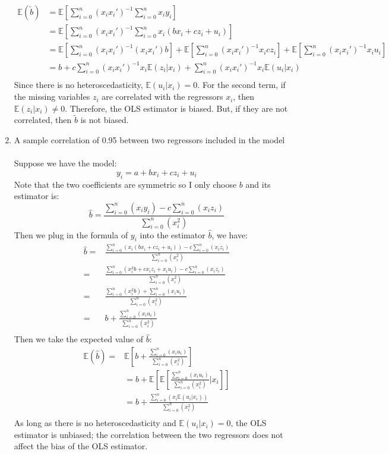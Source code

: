 \documentclass[12pt]{article}
\begin{document}
\begin{flushleft}
\begin{enumerate}
    \begin{align*}
    \mathbb{E}(\tilde{b}) &=\mathbb{E}\left[\sum_{i=0}^n(x_i x_i')^{-1}\sum_{i=0}^n x_i y_i\right] \\
    &= \mathbb{E} \left[ \sum_{i=0}^n(x_i x_i')^{-1}\sum_{i=0}^nx_i (bx_i+cz_i+u_i)\right] \\
    &= \mathbb{E} \left[ \sum_{i=0}^n(x_i x_i')^{-1}(x_i x_i')b \right]+ \mathbb{E} \left[ \sum_{i=0}^n(x_i x_i')^{-1}x_i c z_i \right]+\mathbb{E} \left[ \sum_{i=0}^n(x_i x_i')^{-1} x_i u_i \right]\\
    &= b + c\sum_{i=0}^n(x_i x_i')^{-1}x_i \mathbb{E}(z_i | x_i) + \sum_{i=0}^n(x_i x_i')^{-1}x_i \mathbb{E}(u_i | x_i) \\
    \end{align*}
    Since there is no heteroscedasticity, $\mathbb{E}(u_i | x_i) = 0$. For the second term, if the missing variables $z_i$ are correlated with the regressors $x_i$, then $\mathbb{E}(z_i | x_i) \neq 0$. Therefore, the OLS estimator is biased. But, if they are not correlated, then $\tilde{b}$ is not biased.
    \item A sample correlation of 0.95 between two regressors included in the model\\~\\
    Suppose we have the model:
    \[
    y_i=a+bx_i+cz_i+u_i
    \]
    Note that the two coefficients are symmetric so I only choose $b$ and its estimator is:
    \[
    \hat{b}=\frac{\sum_{i=0}^n(x_i y_i)-c\sum_{i=0}^n(x_i z_i)}{\sum_{i=0}^n(x_i^2)}
    \]
    Then we plug in the formula of $y_i$ into the estimator $\hat{b}$, we have:
    \begin{align*}
        \hat{b}=&\frac{\sum_{i=0}^n(x_i (bx_i+cz_i+u_i))-c\sum_{i=0}^n(x_i z_i)}{\sum_{i=0}^n(x_i^2)}\\
        =&\frac{\sum_{i=0}^n(x_i^2 b+c x_i z_i+ x_i u_i)-c\sum_{i=0}^n(x_i z_i)}{\sum_{i=0}^n(x_i^2)}\\
        =&\frac{\sum_{i=0}^n(x_i^2 b)+\sum_{i=0}^n(x_i u_i)}{\sum_{i=0}^n(x_i^2)}\\
        =&b+\frac{\sum_{i=0}^n(x_i u_i)}{\sum_{i=0}^n(x_i^2)}\\
    \end{align*}
    Then we take the expected value of $\hat{b}$:
    \begin{align*}
        \mathbb{E}(\hat{b})=&\mathbb{E}\left[b+\frac{\sum_{i=0}^n(x_i u_i)}{\sum_{i=0}^n(x_i^2)}\right]\\
        &=b+\mathbb{E}\left[\mathbb{E}\left[\frac{\sum_{i=0}^n(x_i u_i)}{\sum_{i=0}^n(x_i^2)}|x_i\right]\right]\\
        &=b+\frac{\sum_{i=0}^n(x_i \mathbb{E}(u_i|x_i))}{\sum_{i=0}^n(x_i^2)}\\
    \end{align*}
As long as there is no heteroscedasticity and $\mathbb{E}(u_i|x_i)=0$, the OLS estimator is unbiased; the correlation between the two regressors does not affect the bias of the OLS estimator.\\
\end{enumerate}

\end{flushleft}
\end{document}
